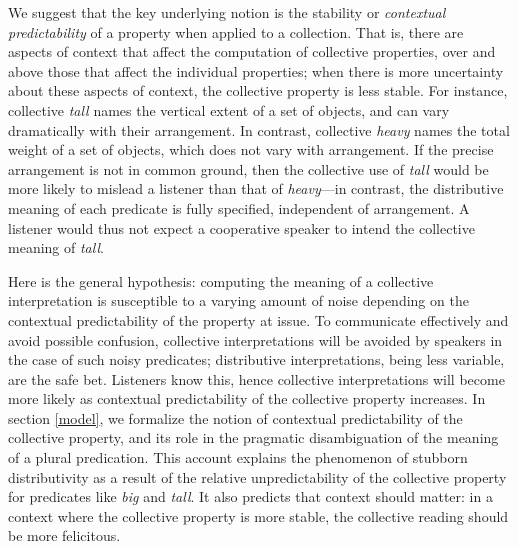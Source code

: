 \documentclass[preprint,12pt,authoryear,titlepage]{elsarticle}
\begin{document}
We suggest that the key underlying notion is the stability or \emph{contextual predictability} of a property when applied to a collection.
That is, there are aspects of context that affect the computation of collective properties, over and above those that affect the individual properties; when there is more uncertainty about these aspects of context, the collective property is less stable.
For instance, collective \emph{tall} names the vertical extent of a set of objects, and can vary dramatically with their arrangement.
In contrast, collective \emph{heavy} names the total weight of a set of objects, which does not vary with arrangement. 
If the precise arrangement is not in common ground, then the collective use of \emph{tall} would be more likely to mislead a listener than that of \emph{heavy}---in contrast, the distributive meaning of each predicate is fully specified, independent of arrangement. A listener would thus not expect a cooperative speaker to intend the collective meaning of \emph{tall}.

Here is the general hypothesis: computing the meaning of a collective interpretation is susceptible to a varying amount of noise depending on the contextual predictability of the property at issue.
To communicate effectively and avoid possible confusion, collective interpretations will be avoided by speakers in the case of such noisy predicates; distributive interpretations, being less variable, are the safe bet. 
Listeners know this, hence collective interpretations will become more likely as contextual predictability of the collective property increases.
In section \ref{model}, we formalize the notion of contextual predictability of the collective property, and its role in the pragmatic disambiguation of the meaning of a plural predication.
This account explains the phenomenon of stubborn distributivity as a result of the relative unpredictability of the collective property for predicates like \emph{big} and \emph{tall}.
It also predicts that context should matter: in a context where the collective property is more stable, the collective reading should be more felicitous.
\end{document}
